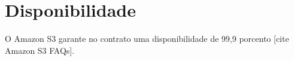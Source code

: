 \section{Disponibilidade}
O Amazon S3 garante no contrato uma disponibilidade de 99,9 porcento [cite Amazon S3 FAQs].



\begin{comment}


Ela facilita o desenvolvimento de programas que aproveitam os recursos de 

 facilita o desenvolvimento de programas que podem ser paralelizados desta forma. Um programador define como particionar os dados e unificar os resultados, e a biblioteca escalona a execução dos processos nos processadores disponíveis, gerencia a comunicação entre máquinas e lida com falhas.


 e gerenciar a comunicação entre máquinas, 

O cenário fica mais complexo se considerarmos que tanto computadores quanto as conexões de rede entre os computadores podem se tornar lentas ou mesmo falhar. A biblioteca Hadoop, uma implementação livre do modelo MapReduce

podem um cenário em que os computadores estão ligados através de uma rede não-confiável, 
No caso de sistemas distribuídos, como os sistemas de muitos provedores de computação na nuvem, é um pouco mais complicado. A comunicação entre processadores é através de conexões de rede, que podem falhar; as próprias máquinas podem falhar ou ficar lentas

Em um sistema distribuído, como é o caso de muitos provedores de computaçãm na nuvem, 

"paralelismo de dados"
MapReduce: modelo de programação para processar grandes volumes de dados
o sistema é responsável por escalonar a execução do programa em um conjunto de computadores, lidar com falhas de máquina e de rede, gerenciar a comunicação entre máquinas. Com isso programadores sem experiência em computação paralela e distribuídos pode usar facilmentes os recursos de um grande sistema distribuído.
[cite MapReduce: Simplified Data Processing on Large Clusters]


\end{comment}
